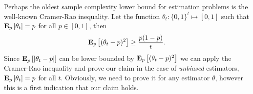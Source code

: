 Perhaps the oldest sample complexity lower bound for estimation problems
is the well-known Cramer-Rao inequality.
Let the function $\theta_t: \{0,1\}^t \mapsto [0,1]$ such that $\bm{\mathrm{E}}_{p} \left[ \theta_t \right]=p$ for
all $p \in [0,1]$, then
\begin{equation}\label{eq:crlb}
  \bm{\mathrm{E}}_{p} \left[ (\theta_t - p)^2 \right] \geq \frac{p(1-p)}{t}.
\end{equation}
Since $\bm{\mathrm{E}}_{p} \left[ |\theta_t - p| \right]$ can be lower bounded
by $\bm{\mathrm{E}}_{p} \left[ (\theta_t - p)^2 \right]$ we can apply the Cramer-Rao inequality and
prove our claim in the case of \emph{unbiased} estimators, $\bm{\mathrm{E}}_{p} \left[ \theta_t \right]=p$
for all $t$. Obviously, we need to prove it for any estimator $\theta$, however
this is a first indication that our claim holds.

